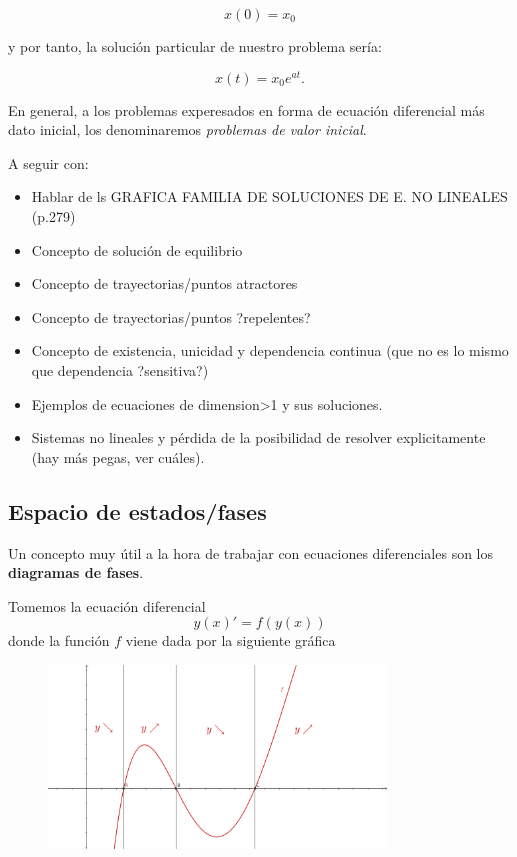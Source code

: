 \begin{equation}
x(0) = x_0
\end{equation}

y por tanto, la solución particular de nuestro problema sería:

\begin{equation}
x(t) = x_0e^{at}.
\end{equation}

En general, a los problemas experesados en forma de ecuación diferencial más dato inicial, los denominaremos \emph{problemas de valor inicial}.

A seguir con:

\begin{itemize}
\item Hablar de ls GRAFICA FAMILIA DE SOLUCIONES DE E. NO LINEALES (p.279)
\item Concepto de solución de equilibrio
\item Concepto de trayectorias/puntos atractores
\item Concepto de trayectorias/puntos ?repelentes?
\item Concepto de existencia, unicidad y dependencia continua (que no es lo mismo que dependencia ?sensitiva?)
\item Ejemplos de ecuaciones de dimension>1 y sus soluciones.
\item Sistemas no lineales y pérdida de la posibilidad de resolver explicitamente (hay más pegas, ver cuáles).
\end{itemize}

\subsection{Espacio de estados/fases}

Un concepto muy útil a la hora de trabajar con ecuaciones diferenciales son los \textbf{diagramas de fases}.

Tomemos la ecuación diferencial
\[y(x)'=f(y(x))\]
donde la función $f$ viene dada por la siguiente gráfica

\begin{figure}[hbtp]
\centering
\includegraphics[width = 0.8\textwidth]{img/propiedades-autonomas.png}
\end{figure}


